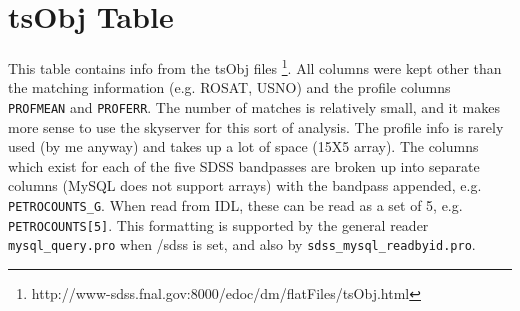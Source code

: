 \section{tsObj Table}

This table contains info from the tsObj files 
\footnote{http://www-sdss.fnal.gov:8000/edoc/dm/flatFiles/tsObj.html}. All
columns were kept other than the matching information (e.g. ROSAT, USNO) and
the profile columns \texttt{PROFMEAN} and \texttt{PROFERR}.  The number of
matches is relatively small, and it makes more sense to use the skyserver for
this sort of analysis.  The profile info is rarely used (by me anyway) and
takes up a lot of space (15X5 array). The columns which exist for each of the
five SDSS bandpasses are broken up into separate columns (MySQL does not
support arrays) with the bandpass appended, e.g. \texttt{PETROCOUNTS\_G}.  When
read from IDL, these can be read as a set of 5, e.g. \texttt{PETROCOUNTS[5]}.
This formatting is supported by the general reader \texttt{mysql\_query.pro}
when /sdss is set, and also by \texttt{sdss\_mysql\_readbyid.pro}.
